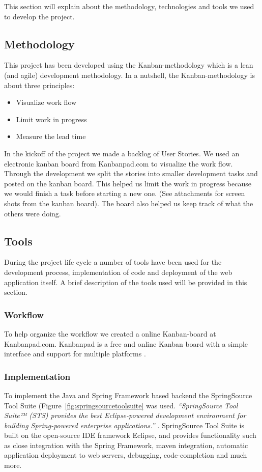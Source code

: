 This section will explain about the methodology, technologies and tools we used to develop the project. 
\subsection{Methodology}

This project has been developed using the Kanban-methodology which is a lean (and agile) development methodology. In a nutshell, the Kanban-methodology is about three principles: 
\begin{itemize}
\item Visualize work flow 
\item Limit work in progress 
\item Measure the lead time
\end{itemize}

In the kickoff of the project we made a backlog of User Stories. We used an electronic kanban board from Kanbanpad.com \citep{TheHybridGroup2012} to visualize the work flow. Through the development we split the stories into smaller development tasks and posted on the kanban board. This helped us limit the work in progress because we would finish a task before starting a new one. (See attachments for screen shots from the kanban board). The board also helped us keep track of what the others were doing.



\subsection{Tools}
During the project life cycle a number of tools have been used for the development process, implementation of code and deployment of the web application itself. A brief description of the tools used will be provided in this section.

\subsubsection{Workflow}
To help organize the workflow we created a online Kanban-board at Kanbanpad.com.  Kanbanpad is a free and online Kanban board with a simple interface and support for multiple platforms \cite{TheHybridGroup2012}.

\subsubsection{Implementation}
To implement the Java and Spring Framework based backend the SpringSource Tool Suite (Figure~\ref{fig:springsourcetoolsuite} was used. \textit{``SpringSource Tool Suite™ (STS) provides the best Eclipse-powered development environment for building Spring-powered enterprise applications.''} \cite{SpringSource}. SpringSource Tool Suite is built on the open-source IDE framework Eclipse, and provides functionality such as close integration with the Spring Framework, maven integration, automatic application deployment to web servers, debugging, code-completion and much more.

